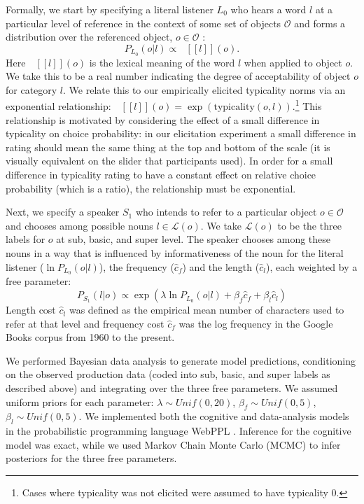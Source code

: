 \documentclass[10pt,letterpaper]{article}
\newcommand{\denote}[1]{\mbox{ $[\![ #1 ]\!]$}}
\begin{document}
Formally, we start by specifying a literal listener $L_0$ who hears a word $l$ at a particular level of reference  in the context of some set of objects $\mathcal{O}$ and forms a distribution over the referenced object, $o \in \mathcal{O}$ : 
$$P_{L_0}(o | l) \propto \denote{l}(o).$$
Here $\denote{l}(o)$ is the lexical meaning of the word $l$ when applied to object $o$. We take this to be a real number indicating the degree of acceptability of object $o$ for category $l$. 
We relate this to our empirically elicited typicality norms via an exponential relationship: $\denote{l}(o)=\exp(\text{typicality}(o,l))$.\footnote{Cases where typicality was not elicited were assumed to have typicality $0$.}
This relationship is motivated by considering the effect of a small difference in typicality on choice probability: in our elicitation experiment a small difference in rating should mean the same thing at the top and bottom of the scale (it is visually equivalent on the slider that participants used).
In order for a small difference in typicality rating to have a constant effect on relative choice probability (which is a ratio), the relationship must be exponential. 

Next, we specify a speaker $S_1$ who intends to refer to a particular object $o \in \mathcal{O}$ and chooses among possible nouns $l \in {\mathcal L}(o)$.
We take ${\mathcal L}(o)$ to be the three labels for $o$ at sub, basic, and super level.
The speaker chooses among these nouns in a way that is influenced by informativeness of the noun for the literal listener ($\ln P_{L_0}(o | l)$), the frequency ($\hat{c}_f$) and the length  ($\hat{c}_l$), each weighted by a free parameter:
$$P_{S_1}(l | o) \propto \exp(\lambda \ln P_{L_0}(o | l) + \beta_f \hat{c}_f  + \beta_l \hat{c}_l)$$
Length cost $\hat{c}_l$ was defined as the empirical mean number of characters used to refer at that level and frequency cost $\hat{c}_f$ was the log frequency in the Google Books corpus from 1960 to the present. 

We performed Bayesian data analysis to generate model predictions, conditioning on the observed production data (coded into sub, basic, and super labels as described above) and integrating over the three free parameters.
We assumed uniform priors for each parameter: $\lambda  \sim Unif(0,20)$, $\beta_f \sim Unif(0,5)$, $\beta_l \sim Unif(0,5)$.
We implemented both the cognitive and data-analysis models in the probabilistic programming language WebPPL \cite{GoodmanStuhlmuller14_DIPPL}.
Inference for the cognitive model was exact, while we used Markov Chain Monte Carlo (MCMC) to infer posteriors for the three free parameters.
\end{document}
